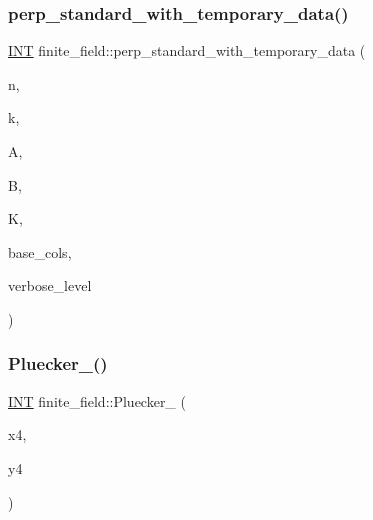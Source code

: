 \subsubsection{\texorpdfstring{perp\+\_\+standard\+\_\+with\+\_\+temporary\+\_\+data()}{perp\_standard\_with\_temporary\_data()}}
{\footnotesize\ttfamily \mbox{\hyperlink{galois_8h_a09fddde158a3a20bd2dcadb609de11dc}{I\+NT}} finite\+\_\+field\+::perp\+\_\+standard\+\_\+with\+\_\+temporary\+\_\+data (\begin{DoxyParamCaption}\item[{\mbox{\hyperlink{galois_8h_a09fddde158a3a20bd2dcadb609de11dc}{I\+NT}}}]{n,  }\item[{\mbox{\hyperlink{galois_8h_a09fddde158a3a20bd2dcadb609de11dc}{I\+NT}}}]{k,  }\item[{\mbox{\hyperlink{galois_8h_a09fddde158a3a20bd2dcadb609de11dc}{I\+NT}} $\ast$}]{A,  }\item[{\mbox{\hyperlink{galois_8h_a09fddde158a3a20bd2dcadb609de11dc}{I\+NT}} $\ast$}]{B,  }\item[{\mbox{\hyperlink{galois_8h_a09fddde158a3a20bd2dcadb609de11dc}{I\+NT}} $\ast$}]{K,  }\item[{\mbox{\hyperlink{galois_8h_a09fddde158a3a20bd2dcadb609de11dc}{I\+NT}} $\ast$}]{base\+\_\+cols,  }\item[{\mbox{\hyperlink{galois_8h_a09fddde158a3a20bd2dcadb609de11dc}{I\+NT}}}]{verbose\+\_\+level }\end{DoxyParamCaption})}

\mbox{\label{classfinite__field_afd38a1b711e67996540c3a2ce60bef51}} 
\subsubsection{\texorpdfstring{Pluecker\+\_()}{Pluecker\_12()}}
{\footnotesize\ttfamily \mbox{\hyperlink{galois_8h_a09fddde158a3a20bd2dcadb609de11dc}{I\+NT}} finite\+\_\+field\+::\+Pluecker\+\_ (\begin{DoxyParamCaption}\item[{\mbox{\hyperlink{galois_8h_a09fddde158a3a20bd2dcadb609de11dc}{I\+NT}} $\ast$}]{x4,  }\item[{\mbox{\hyperlink{galois_8h_a09fddde158a3a20bd2dcadb609de11dc}{I\+NT}} $\ast$}]{y4 }\end{DoxyParamCaption})}

